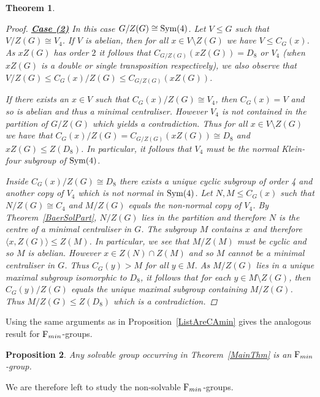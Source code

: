 \documentclass[a4paper,11pt]{article}
\theoremstyle{plain}
\newtheorem{thm}{Theorem}[section]
\newtheorem{prop}[thm]{Proposition}
\numberwithin{thm}{section}
\begin{document}
\begin{thm}
\begin{proof}
\underline{\bf Case (2)}\newline
In this case $G/Z(G)\cong {\rm Sym}(4)$. 
Let $V\leq G$ such that $V/Z(G)\cong V_4$.
If $V$ is abelian, then for all $x\in V\setminus Z(G)$ we have $V\leq C_G(x)$.
As $xZ(G)$ has order $2$ it follows that $C_{G/Z(G)}(xZ(G))=D_8$ or $V_4$ (when $xZ(G)$ is a double or single transposition respectively), we also observe that $V/Z(G)\leq C_G(x)/Z(G)\leq  C_{G/Z(G)}(xZ(G))$.

If there exists an $x\in V$ such that $C_G(x)/Z(G)\cong V_4$, then $C_G(x)=V$ and so is abelian and thus a minimal centraliser.
However $V_4$ is not contained in the partition of $G/Z(G)$ which yields a contradiction. 
Thus for all $x\in V\setminus Z(G)$ we have that $C_G(x)/Z(G)=C_{G/Z(G)}(xZ(G))\cong D_8$ and $xZ(G)\leq Z(D_8)$.
In particular, it follows that $V_4$ must be the normal Klein-four subgroup of ${\rm Sym}(4)$.

Inside $C_G(x)/Z(G)\cong D_8$ there exists a unique cyclic subgroup of order 4 and another copy of $V_4$ which is not normal in ${\rm Sym}(4)$.
Let $N,M\leq C_G(x)$ such that $N/Z(G)\cong C_4$ and $M/Z(G)$ equals the non-normal copy of $V_4$.
By Theorem~\ref{BaerSolPart}, $N/Z(G)$ lies in the partition and therefore $N$ is the centre of a minimal centraliser in $G$.
The subgroup $M$ contains $x$ and therefore $\langle x,Z(G)\rangle \leq Z(M)$. 
In particular, we see that $M/Z(M)$ must be cyclic and so $M$ is abelian.
However $x\in Z(N)\cap Z(M)$ and so $M$ cannot be a minimal centraliser in $G$.
Thus $C_G(y)>M$ for all $y\in M$.
As $M/Z(G)$ lies in a unique maximal subgroup isomorphic to $D_8$, it follows that for each $y\in M\setminus Z(G)$, then $C_G(y)/Z(G)$ equals the unique maximal subgroup containing $M/Z(G)$.
Thus $M/Z(G)\leq Z(D_8)$ which is a contradiction. 
\end{proof}

\end{thm}

Using the same arguments as in Proposition~\ref{ListAreCAmin} gives the analogous result for ${\rm F}_{min}$-groups.

\begin{prop}
Any solvable group occurring in Theorem~\ref{MainThm} is an ${\rm F}_{min}$-group.
\end{prop}

We are therefore left to study the non-solvable ${\rm F}_{min}$-groups.
\end{document}
